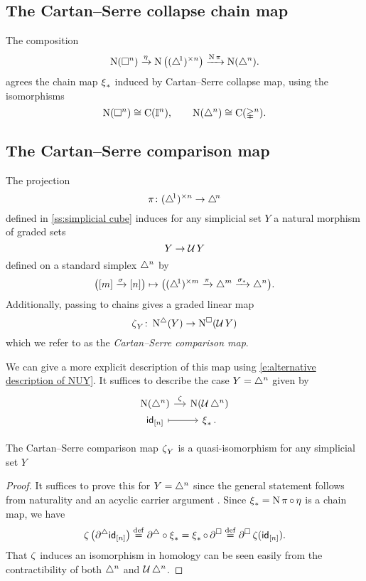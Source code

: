 \subsection{The Cartan--Serre collapse chain map}


\begin{lemma}
	The composition
	\[
	\operatorname{N}(\square^n) \xrightarrow{\operatorname{\eta}} \operatorname{N} \big( (\triangle^{\!1})^{\times n} \big) \xrightarrow{\operatorname{N} \operatorname{\pi}} \operatorname{N}(\triangle^n).
	\]
	agrees the chain map $\operatorname{\xi}_\ast$ induced by Cartan--Serre collapse map, using the isomorphisms
	\[
	\operatorname{N}(\square^n) \cong \operatorname{C}(\mathbb{I}^n), \qquad
	\operatorname{N}(\triangle^n) \cong \operatorname{C}(\mathbb{\Delta}^n).
	\]
\end{lemma}

\subsection{The Cartan--Serre comparison map} \label{ss:comparison map}

The projection
\[
\operatorname{\pi} \colon (\triangle^{\!1})^{\times n} \to \triangle^{\!n}
\]
defined in \cref{ss:simplicial cube} induces for any simplicial set $Y$ a natural morphism of graded sets
\[
Y \to \operatorname{\mathcal{U}} Y
\]
defined on a standard simplex $\triangle^n$ by
\[
\big( [m] \xrightarrow{\sigma} [n] \big) \mapsto
\big( (\triangle^{\!1})^{\times m} \xrightarrow{\operatorname{\pi}} \triangle^m \xrightarrow{\sigma_\ast} \triangle^n \big).
\]
Additionally, passing to chains gives a graded linear map
\[
\operatorname{\zeta}_Y \colon \operatorname{N^{\triangle}}(Y) \to \operatorname{N^{\square}}(\operatorname{\mathcal{U}} Y)
\]
which we refer to as the \textit{Cartan--Serre comparison map}.

We can give a more explicit description of this map using \eqref{e:alternative description of NUY}.
It suffices to describe the case $Y = \triangle^n$ given by
\[
\begin{tikzcd}[column sep=small, row sep=0]
\chains(\simplex^n) \arrow[r, "\CScomp"] &
\chains(\cubify \simplex^n) \\
\id_{[n]} \arrow[r, mapsto] &
\CScollapse_\ast.
\end{tikzcd}
\]

\begin{lemma}
	The Cartan--Serre comparison map $\operatorname{\zeta}_Y$ is a quasi-isomorphism for any simplicial set $Y$
\end{lemma}

\begin{proof}
	It suffices to prove this for $Y = \triangle^n$ since the general statement follows from naturality and an acyclic carrier argument \cite{eilenberg1953acyclic}.
	Since $\operatorname{\xi}_\ast = \operatorname{N} \operatorname{\pi} \circ \operatorname{\eta}$ is a chain map, we have
	\begin{align*}
	\operatorname{\zeta} \big( \partial^\triangle \mathsf{id}_{[n]} \big) \stackrel{\mathrm{def}}{=}
	\partial^\triangle \circ \operatorname{\xi}_\ast =
	\operatorname{\xi}_\ast \circ \, \partial^\square \stackrel{\mathrm{def}}{=}
	\partial^\square \operatorname{\zeta} (\mathsf{id}_{[n]}).
	\end{align*}
	That $\operatorname{\zeta}$ induces an isomorphism in homology can be seen easily from the contractibility of both $\triangle^n$ and $\operatorname{\mathcal{U}} \triangle^n$.
\end{proof}

